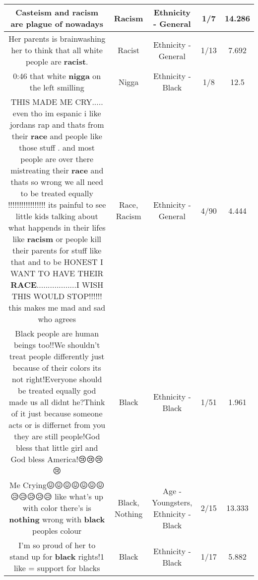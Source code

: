 \documentclass[11pt]{article}
\newlength\mylength
\begin{document}
\begin{center}
\begin{longtable}{|C{.65\mylength}|C{.30\mylength}|C{.12\mylength}|C{.12\mylength}|C{.12\mylength}|}
  \small Casteism and \textbf{racism} are plague of nowadays\normalsize   & Racism & Ethnicity - General & 1/7 & 14.286 \\  \hline
  \small Her parents is brainwashing her to think that all white people are \textbf{racist}.\normalsize   & Racist & Ethnicity - General & 1/13 & 7.692 \\  \hline
  \small 0:46 that white \textbf{nigga} on the left smilling\normalsize   & Nigga & Ethnicity - Black & 1/8 & 12.5 \\  \hline
  \small THIS MADE ME CRY..... even tho im espanic i like jordans rap and thats from their \textbf{race} and people like those stuff .  and most people are over there  mistreating their \textbf{race} and thats so wrong we all need to be treated equally !!!!!!!!!!!!!!!!! its painful to see little kids talking about what happends in their lifes  like \textbf{racism} or people kill their parents for stuff like that and to be HONEST I WANT TO HAVE THEIR \textbf{RACE}..................I WISH THIS WOULD STOP!!!!!!  this makes me mad and sad who agrees\normalsize   & Race, Racism & Ethnicity - General & 4/90 & 4.444 \\  \hline
  \small Black people are human beings too!!We shouldn't treat people differently just because of their colors its not right!Everyone should be treated equally god made us all didnt he?Think of it just because someone acts or is differnet from you they are still people!God bless that little girl and God bless America!😢😢😢😢\normalsize   & Black & Ethnicity - Black & 1/51 & 1.961 \\  \hline
  \small Me Crying😖😖😖😖😖😖😖😥😥😥😥😥 like what's up with color there's is \textbf{nothing} wrong with \textbf{black} peoples colour\normalsize   & Black, Nothing & Age - Youngsters, Ethnicity - Black & 2/15 & 13.333 \\  \hline
  \small I'm so proud of her to stand up for \textbf{black} rights!1 like = support for blacks\normalsize   & Black & Ethnicity - Black & 1/17 & 5.882 \\  \hline

\end{longtable}
\end{center}
\end{document}
